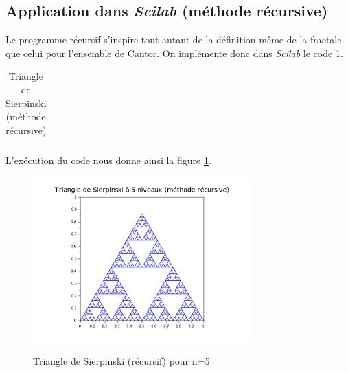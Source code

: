 \documentclass[a4paper,10pt]{report}
\begin{document}
\subsection{Application dans \textit{Scilab} (méthode récursive)}
Le programme récursif s'inspire tout autant de la définition même de la fractale que celui pour l'ensemble de Cantor. On implémente donc dans \textit{Scilab} le code \ref{code_sierp}.
\begin{table}[H]
\caption{Triangle de Sierpinski (méthode récursive)}
\begin{tabular}{l}
\\
\end{tabular}
\label{code_sierp}
\end{table}
L'exécution du code nous donne ainsi la figure \ref{sierpinski_recursif}.
\begin{figure}[H]
\centering
\caption{Triangle de Sierpinski (récursif) pour n=5}
\includegraphics[width=0.75\textwidth]{sierpinski_recursif.pdf}
\label{sierpinski_recursif}
\end{figure}

\newpage
\end{document}
